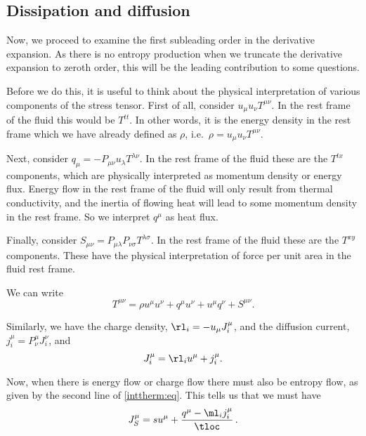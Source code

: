 \subsection{Dissipation and diffusion}\label{sec:visc}

Now, we proceed to examine the first subleading order in the derivative expansion. As there is no entropy production when we truncate the derivative expansion to zeroth order, this will be the leading contribution to some questions.

Before we do this, it is useful to think about the physical interpretation of various components of the stress tensor. First of all, consider $u_\mu u_\nu T^{\mu\nu}$. In the rest frame of the fluid this would be $T^{tt}$. In other words, it is the energy density in the rest frame which we have already defined as $\rho$, i.e.\ $\rho=u_\mu u_\nu T^{\mu\nu}$.

Next, consider $q_\mu = -P_{\mu\nu}u_{\lambda}T^{\lambda\nu}$. In the rest frame of the fluid these are the $T^{tx}$ components, which are physically interpreted as momentum density or energy flux. Energy flow in the rest frame of the fluid will only result from thermal conductivity, and the inertia of flowing heat will lead to some momentum density in the rest frame. So we interpret $q^\mu$ as heat flux.

Finally, consider $S_{\mu\nu}=P_{\mu\lambda}P_{\nu\sigma}T^{\lambda\sigma}$. In the rest frame of the fluid these are the $T^{xy}$ components. These have the physical interpretation of force per unit area in the fluid rest frame.

We can write
%
\begin{equation}\label{strsssep:eq}
  T^{\mu\nu} = \rho u^\mu u^\nu + q^\mu u^\nu + u^\mu q^\nu + S^{\mu\nu}.
\end{equation}
%

Similarly, we have the charge density, $\rl_i = -u_\mu J^\mu_i$, and the diffusion current, $j^\mu_i = P^{\mu}_{\nu} J^\nu_i$, and
%
\begin{equation}\label{currentsep:eq}
   J^\mu_i = \rl_i u^\mu + j^\mu_i.
\end{equation}
%

Now, when there is energy flow or charge flow there must also be entropy flow, as given by the second line of \eqref{inttherm:eq}. This tells us that we must have
%
\begin{equation}\label{entcurrentsep:eq}
  J^\mu_S = s u^\mu + \frac{q^\mu-\ml_i j^\mu_{i}}{\tloc}\,.
\end{equation}
%

